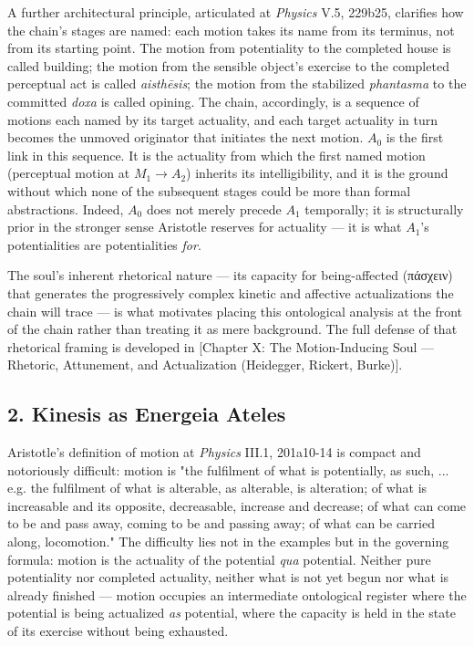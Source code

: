 \documentclass[12pt]{article}
\newcommand{\gk}[1]{{\greekfont #1}}%
\newcommand{\gk}[1]{{\greekfont #1}}%
\newcommand{\gk}[1]{#1}%
\begin{document}
A further architectural principle, articulated at \textit{Physics} V.5, 229b25, clarifies how the chain's stages are named: each motion takes its name from its terminus, not from its starting point. The motion from potentiality to the completed house is called building; the motion from the sensible object's exercise to the completed perceptual act is called \textit{aisthēsis}; the motion from the stabilized \textit{phantasma} to the committed \textit{doxa} is called opining. The chain, accordingly, is a sequence of motions each named by its target actuality, and each target actuality in turn becomes the unmoved originator that initiates the next motion. $A_0$ is the first link in this sequence. It is the actuality from which the first named motion (perceptual motion at $M_1$$\to$$A_2$) inherits its intelligibility, and it is the ground without which none of the subsequent stages could be more than formal abstractions. Indeed, $A_0$ does not merely precede $A_1$ temporally; it is structurally prior in the stronger sense Aristotle reserves for actuality --- it is what $A_1$'s potentialities are potentialities \textit{for}.

The soul's inherent rhetorical nature --- its capacity for being-affected (\gk{πάσχειν}) that generates the progressively complex kinetic and affective actualizations the chain will trace --- is what motivates placing this ontological analysis at the front of the chain rather than treating it as mere background. The full defense of that rhetorical framing is developed in [Chapter X: The Motion-Inducing Soul --- Rhetoric, Attunement, and Actualization (Heidegger, Rickert, Burke)].

\subsection*{2. Kinesis as Energeia Ateles}

Aristotle's definition of motion at \textit{Physics} III.1, 201a10-14 is compact and notoriously difficult: motion is "the fulfilment of what is potentially, as such, ... e.g. the fulfilment of what is alterable, as alterable, is alteration; of what is increasable and its opposite, decreasable, increase and decrease; of what can come to be and pass away, coming to be and passing away; of what can be carried along, locomotion." The difficulty lies not in the examples but in the governing formula: motion is the actuality of the potential \textit{qua} potential. Neither pure potentiality nor completed actuality, neither what is not yet begun nor what is already finished --- motion occupies an intermediate ontological register where the potential is being actualized \textit{as} potential, where the capacity is held in the state of its exercise without being exhausted.
\end{document}
